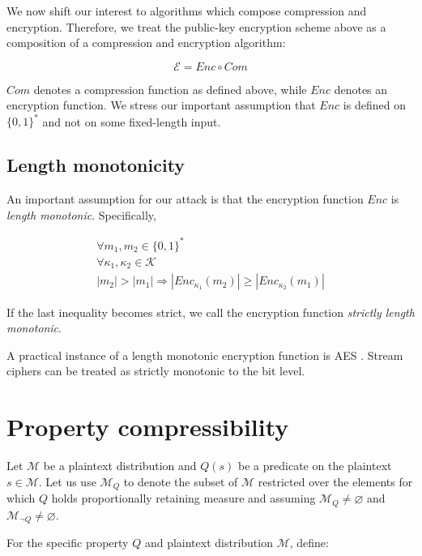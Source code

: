 \documentclass[conference, letterpaper, 10pt]{IEEEtran}
\let\emptyset\varnothing
\begin{document}
We now shift our interest to algorithms which compose compression and
encryption.  Therefore, we treat the public-key encryption scheme above as a
composition of a compression and encryption algorithm:

\begin{equation*}
    \mathcal{E} = Enc \circ Com
\end{equation*}

$Com$ denotes a compression function as defined above, while $Enc$ denotes an
encryption function. We stress our important assumption that $Enc$ is defined
on $\{0, 1\}^*$ and not on some fixed-length input.

\subsection{Length monotonicity}\label{subsec:lenmonotone}

An important assumption for our attack is that the encryption function $Enc$ is
\textit{length monotonic}. Specifically,

\begin{equation*}
\begin{split}
\forall m_1, m_2 \in \{0, 1\}^*\\
\forall \kappa_1, \kappa_2 \in \mathcal{K}\\
|m_2| > |m_1|
\Rightarrow
|Enc_{\kappa_1}(m_2)| \geq |Enc_{\kappa_2}(m_1)|
\end{split}
\end{equation*}

If the last inequality becomes strict, we call the encryption function
\textit{strictly length monotonic}.

A practical instance of a length monotonic encryption function is AES \cite{c8}.
Stream ciphers can be treated as strictly monotonic to the bit level.

\section{Property compressibility}\label{sec:propertycom}

Let $\mathcal{M}$ be a plaintext distribution and $Q(s)$ be a predicate on the
plaintext $s \in \mathcal{M}$. Let us use $\mathcal{M}_Q$ to denote the subset
of $\mathcal{M}$ restricted over the elements for which $Q$ holds
proportionally retaining measure and assuming $\mathcal{M}_Q \neq \emptyset$
and $\mathcal{M}_{\lnot Q} \neq \emptyset$.

For the specific property $Q$ and plaintext distribution $\mathcal{M}$, define:
\end{document}
